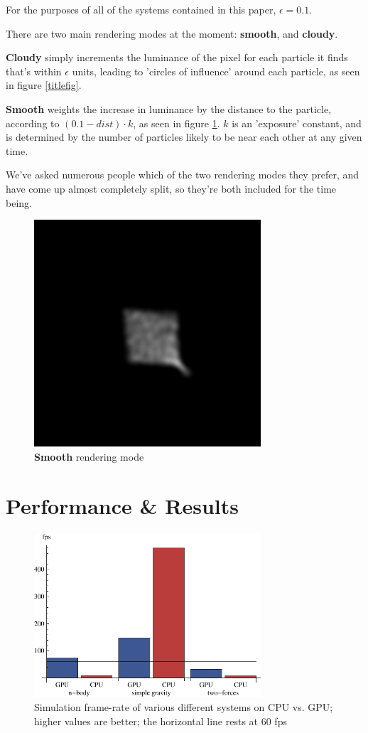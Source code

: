 \documentclass{acmsiggraph}
\begin{document}
For the purposes of all of the systems contained in this paper, $\epsilon=0.1$.

There are two main rendering modes at the moment: {\bf smooth}, and {\bf cloudy}.

{\bf Cloudy} simply increments the luminance of the pixel for each particle it finds that's within $\epsilon$ units, leading to 'circles of influence' around each particle, as seen in figure \ref{titlefig}.

{\bf Smooth} weights the increase in luminance by the distance to the particle, according to $(0.1 - dist) \cdot k$, as seen in figure \ref{smoothfig}. $k$ is an 'exposure' constant, and is determined by the number of particles likely to be near each other at any given time.

We've asked numerous people which of the two rendering modes they prefer, and have come up almost completely split, so they're both included for the time being.

\begin{figure}
    \includegraphics[width=84.5mm]{soft.png}
    \caption{{\bf Smooth} rendering mode}
    \label{smoothfig}
\end{figure}

\section{Performance \& Results}

\label{performanceSection}

\begin{figure}
    \includegraphics[width=84.5mm]{basicSpeedPlot.pdf}
    \caption{Simulation frame-rate of various different systems on CPU vs. GPU; higher values are better; the horizontal line rests at 60 fps}
    \label{fig:basicSpeedPlot}
\end{figure}
\end{document}
